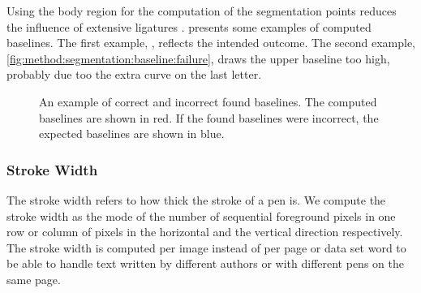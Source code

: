 	Using the body region for the computation of the segmentation points reduces the influence of extensive ligatures \cite{lee2012binary}.  presents some examples of computed baselines. The first example, , reflects the intended outcome. The second example, \cref{fig:method:segmentation:baseline:failure}, draws the upper baseline too high, probably due too the extra curve on the last letter.

	\begin{figure}
		\centering
		\hspace{0.05\columnwidth}
		\caption{An example of \protect{} correct and \protect{} incorrect found baselines. The computed baselines are shown in red. If the found baselines were incorrect, the expected baselines are shown in blue.}
		\label{fig:method:segmentation:baseline}
	\end{figure}

\subsubsection{Stroke Width}
\label{sss:method:segmentaton:strokwidth}
	The stroke width refers to how thick the stroke of a pen is. We compute the stroke width as the mode of the number of sequential foreground pixels in one row or column of pixels in the horizontal and the vertical direction respectively. The stroke width is computed per image instead of per page or data set word to be able to handle text written by different authors or with different pens on the same page.

